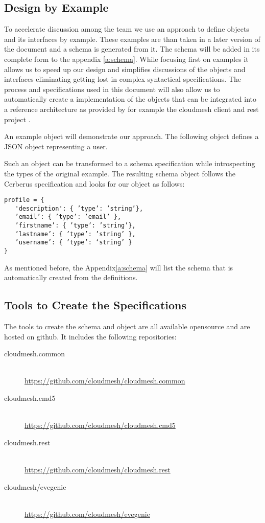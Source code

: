 \documentclass[9pt,twocolumn]{styles/osajnl}
\begin{document}

\subsection{Design by Example}

To accelerate discussion among the team we use an approach to define
objects and its interfaces by example. These examples are than taken
in a later version of the document and a schema is generated from
it. The schema will be added in its complete form to the appendix
\ref{a:schema}. While focusing first on examples it allows us to speed
up our design and simplifies discussions of the objects and interfaces
eliminating getting lost in complex syntactical specifications. The
process and specifications used in this document will also allow us to
automatically create a implementation of the objects that can be
integrated into a reference architecture as provided by for example
the cloudmesh client and rest project \cite{??}.

An example object will demonstrate our approach. The following object
defines a JSON object representing a user. 



 
Such an object can be transformed to a schema specification 
while introspecting the types of the original example. The resulting
schema object follows the Cerberus \cite{??} specification and looks
for our object as follows:

\begin{Verbatim}
profile = {  
   'description': { ’type’: ’string’},  
   ’email’: { ’type’: ’email’ },  
   ’firstname’: { ’type’: ’string’},  
   ’lastname’: { ’type’: ’string’ },   
   ’username’: { ’type’: ‘string’ } 
}  
\end{Verbatim}

As mentioned before, the Appendix\ref{a:schema} will list the schema
that is automatically created from the definitions.

\subsection{Tools to Create the Specifications}

The tools to create the schema and object are all available opensource
and are hosted on github. It includes the following repositories:

\begin{description}
\item[cloudmesh.common] ~\\
  \url{https://github.com/cloudmesh/cloudmesh.common}
\item[cloudmesh.cmd5] ~\\
  \url{https://github.com/cloudmesh/cloudmesh.cmd5}
\item[cloudmesh.rest] ~\\
  \url{https://github.com/cloudmesh/cloudmesh.rest}
\item[cloudmesh/evegenie] ~\\
  \url{https://github.com/cloudmesh/evegenie}
\end{description}
\end{document}

